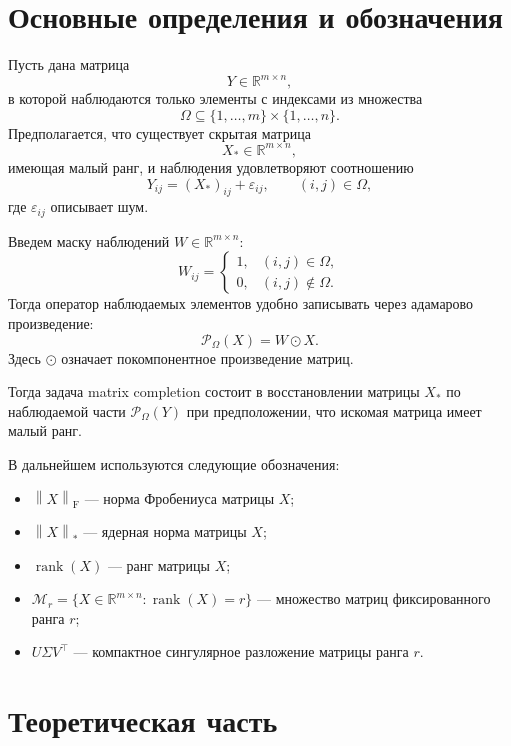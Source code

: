 \documentclass[a4paper,12pt]{article}
\newcommand{\R}{\mathbb{R}}
\newcommand{\fro}[1]{\left\lVert #1 \right\rVert_{\mathrm F}}
\newcommand{\nuc}[1]{\left\lVert #1 \right\rVert_*}
\newcommand{\rank}{\operatorname{rank}}
\renewcommand{\Proj}{\mathcal{P}}
\newcommand{\Mcal}{\mathcal{M}}
\begin{document}
\newpage

\section{Основные определения и обозначения}
\label{sec:definitions}

Пусть дана матрица
\[
Y \in \R^{m \times n},
\]
в которой наблюдаются только элементы с индексами из множества
\[
\Omega \subseteq \{1,\dots,m\} \times \{1,\dots,n\}.
\]
Предполагается, что существует скрытая матрица
\[
X_* \in \R^{m \times n},
\]
имеющая малый ранг, и наблюдения удовлетворяют соотношению
\[
Y_{ij} = (X_*)_{ij} + \varepsilon_{ij}, \qquad (i,j)\in\Omega,
\]
где $\varepsilon_{ij}$ описывает шум.

\begin{definition}
Введем маску наблюдений $W\in\R^{m\times n}$:
\[
W_{ij} =
\begin{cases}
1, & (i,j)\in\Omega,\\
0, & (i,j)\notin\Omega.
\end{cases}
\]
Тогда оператор наблюдаемых элементов удобно записывать через адамарово произведение:
\[
\Proj_\Omega(X)=W\odot X.
\]
Здесь $\odot$ означает покомпонентное произведение матриц.
\end{definition}

Тогда задача matrix completion состоит в восстановлении матрицы $X_*$ по наблюдаемой части $\Proj_\Omega(Y)$ при предположении, что искомая матрица имеет малый ранг.

В дальнейшем используются следующие обозначения:
\begin{itemize}
    \item $\fro{X}$ --- норма Фробениуса матрицы $X$;
    \item $\nuc{X}$ --- ядерная норма матрицы $X$;
    \item $\rank(X)$ --- ранг матрицы $X$;
    \item $\Mcal_r = \{X \in \R^{m\times n} : \rank(X)=r\}$ --- множество матриц фиксированного ранга $r$;
    \item $U\Sigma V^\top$ --- компактное сингулярное разложение матрицы ранга $r$.
\end{itemize}

\newpage

\section{Теоретическая часть}
\label{sec:theory}
\end{document}
